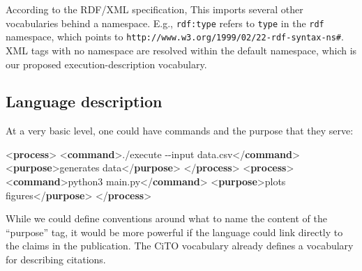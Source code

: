 \documentclass[natbib=false,manuscript,authordraft]{acmart}
\newenvironment{Shaded}{}{}
\newcommand{\KeywordTok}[1]{\textcolor[rgb]{0.00,0.44,0.13}{\textbf{#1}}}
\newcommand{\NormalTok}[1]{#1}
\begin{document}
\normalsize

According to the RDF/XML specification, This imports several other
vocabularies behind a namespace. E.g., \texttt{rdf:type} refers to
\texttt{type} in the \texttt{rdf} namespace, which points to
\texttt{http://www.w3.org/1999/02/22-rdf-syntax-ns\#}. XML tags with no
namespace are resolved within the default namespace, which is our
proposed execution-description vocabulary.

\hypertarget{language-description}{%
\subsection{Language description}\label{language-description}}

At a very basic level, one could have commands and the purpose that they
serve:

\small

\begin{Shaded}
\begin{Highlighting}[]

\NormalTok{\textless{}}\KeywordTok{process}\NormalTok{\textgreater{}}
\NormalTok{  \textless{}}\KeywordTok{command}\NormalTok{\textgreater{}./execute {-}{-}input data.csv\textless{}/}\KeywordTok{command}\NormalTok{\textgreater{}}
\NormalTok{  \textless{}}\KeywordTok{purpose}\NormalTok{\textgreater{}generates data\textless{}/}\KeywordTok{purpose}\NormalTok{\textgreater{}}
\NormalTok{\textless{}/}\KeywordTok{process}\NormalTok{\textgreater{}}
\NormalTok{\textless{}}\KeywordTok{process}\NormalTok{\textgreater{}}
\NormalTok{  \textless{}}\KeywordTok{command}\NormalTok{\textgreater{}python3 main.py\textless{}/}\KeywordTok{command}\NormalTok{\textgreater{}}
\NormalTok{  \textless{}}\KeywordTok{purpose}\NormalTok{\textgreater{}plots figures\textless{}/}\KeywordTok{purpose}\NormalTok{\textgreater{}}
\NormalTok{\textless{}/}\KeywordTok{process}\NormalTok{\textgreater{}}
\end{Highlighting}
\end{Shaded}

\normalsize

While we could define conventions around what to name the content of the
``purpose'' tag, it would be more powerful if the language could link
directly to the claims in the publication. The CiTO vocabulary
\cite{shotton_cito_2010} already defines a vocabulary for describing
citations.

\small
\end{document}
